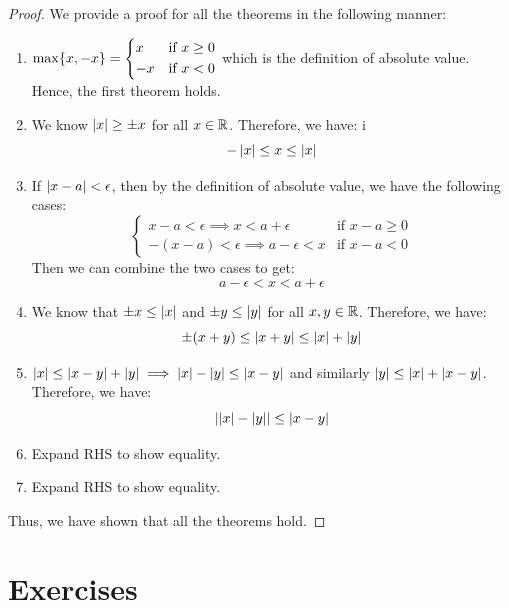 \documentclass[openany]{book}
\begin{document}
\begin{proof}
    We provide a proof for all the theorems in the following manner:
    \begin{enumerate}
    \item $\max\{x, -x\} = \begin{dcases}
        x & \text{if } x \geq 0 \\
        -x & \text{if } x < 0
    \end{dcases}$ which is the definition of absolute value. Hence, the first theorem holds.
    \item We know $\left| x \right| \geq \pm x$ for all $x \in \mathbb{R}$. Therefore, we have:
i    $$-\left| x \right| \leq x \leq \left| x \right|$$
    \item If $\left| x - a \right| < \epsilon$, then by the definition of absolute value, we have the following cases: 
    $$\begin{cases}
        x - a < \epsilon \implies x < a + \epsilon & \text{if } x - a \geq 0  \\
        -(x - a) < \epsilon \implies a - \epsilon < x & \text{if } x - a < 0
    \end{cases}$$
    Then we can combine the two cases to get:
    $$a - \epsilon < x < a + \epsilon$$
    \item We know that $\pm x \leq \left| x \right|$ and $\pm y \leq \left| y \right|$ for all $x, y \in \mathbb{R}$. Therefore, we have:
    $$\pm(x + y) \leq \left| x + y \right| \leq \left| x \right| + \left| y \right|$$
    \item $\left| x \right| \leq \left| x-y \right| + \left| y \right| \implies \left| x \right| - \left| y \right| \leq \left| x - y \right|$ and similarly $\left| y \right| \leq \left| x \right| + \left| x - y \right|$. Therefore, we have:
    $$\left| \left| x \right| - \left| y \right| \right| \leq \left| x - y \right|$$
    \item Expand RHS to show equality.
    \item Expand RHS to show equality.
    \end{enumerate}
    Thus, we have shown that all the theorems hold.
\end{proof}
\section{Exercises}
\end{document}
